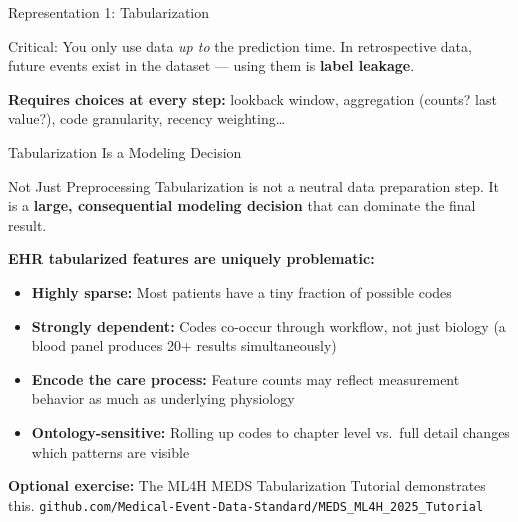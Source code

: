 \documentclass[aspectratio=169,10pt]{beamer}
\begin{document}
\begin{frame}{Representation 1: Tabularization}
\begin{center}
\end{center}
\vspace{0.1em}
\alert{Critical:} You only use data \emph{up to} the prediction time. In retrospective data, future events exist in the dataset --- using them is \textbf{label leakage}.

\pause
\vspace{0.1em}
\textbf{Requires choices at every step:} lookback window, aggregation (counts? last value?), code granularity, recency weighting\ldots
\end{frame}

\begin{frame}{Tabularization Is a Modeling Decision}
\begin{alertblock}{Not Just Preprocessing}
Tabularization is not a neutral data preparation step. It is a \textbf{large, consequential modeling decision} that can dominate the final result.
\end{alertblock}
\vspace{0.2em}
\textbf{EHR tabularized features are uniquely problematic:}
\begin{itemize}[<+->]
    \item \textbf{Highly sparse:} Most patients have a tiny fraction of possible codes
    \item \textbf{Strongly dependent:} Codes co-occur through workflow, not just biology (a blood panel produces 20+ results simultaneously)
    \item \textbf{Encode the care process:} Feature counts may reflect measurement behavior as much as underlying physiology
    \item \textbf{Ontology-sensitive:} Rolling up codes to chapter level vs.\ full detail changes which patterns are visible
\end{itemize}

\vspace{0.2em}
{\small\textbf{Optional exercise:} The ML4H MEDS Tabularization Tutorial demonstrates this.
\texttt{\color{columbia}github.com/Medical-Event-Data-Standard/MEDS\_ML4H\_2025\_Tutorial}}
\end{frame}
\end{document}
